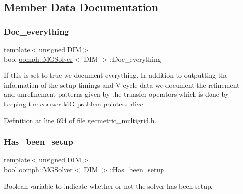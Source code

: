 \subsection{Member Data Documentation}
\mbox{\label{classoomph_1_1MGSolver_a3134e1d815d8d6d974f4ba4cabec2bd7}} 
\subsubsection{\texorpdfstring{Doc\+\_\+everything}{Doc\_everything}}
{\footnotesize\ttfamily template$<$unsigned D\+IM$>$ \\
bool \hyperlink{classoomph_1_1MGSolver}{oomph\+::\+M\+G\+Solver}$<$ D\+IM $>$\+::Doc\+\_\+everything\hspace{0.3cm}{\ttfamily [private]}}



If this is set to true we document everything. In addition to outputting the information of the setup timings and V-\/cycle data we document the refinement and unrefinement patterns given by the transfer operators which is done by keeping the coarser MG problem pointers alive. 



Definition at line 694 of file geometric\+\_\+multigrid.\+h.

\mbox{\label{classoomph_1_1MGSolver_ae78a2b15951afde6d3e60bd9127fb978}} 
\subsubsection{\texorpdfstring{Has\+\_\+been\+\_\+setup}{Has\_been\_setup}}
{\footnotesize\ttfamily template$<$unsigned D\+IM$>$ \\
bool \hyperlink{classoomph_1_1MGSolver}{oomph\+::\+M\+G\+Solver}$<$ D\+IM $>$\+::Has\+\_\+been\+\_\+setup\hspace{0.3cm}{\ttfamily [private]}}



Boolean variable to indicate whether or not the solver has been setup. 



